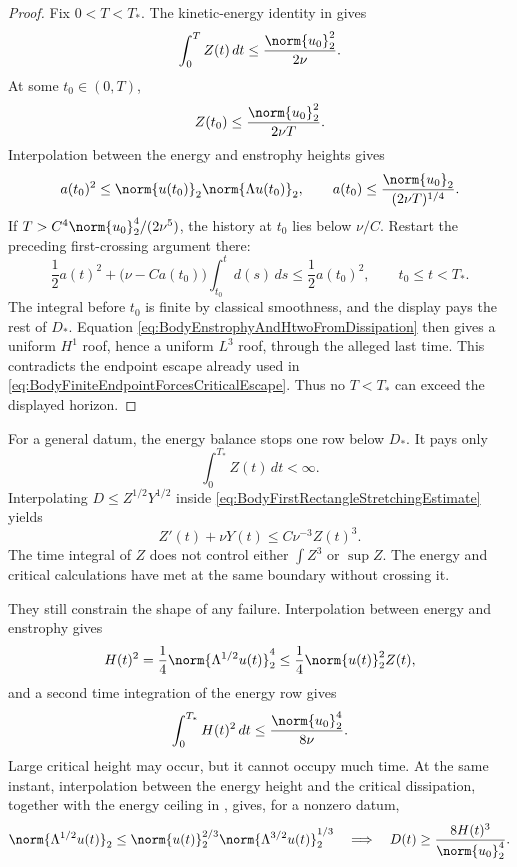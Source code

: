 \begin{proof}
Fix \(0<T<T_*\).  The kinetic-energy identity in
 gives
\[
  \int_0^T Z(t)\,dt
  \leq\frac{\norm{u_0}_2^2}{2\nu}.
\]
At some \(t_0\in(0,T)\),
\[
  Z(t_0)\leq\frac{\norm{u_0}_2^2}{2\nu T}.
\]
Interpolation between the energy and enstrophy heights gives
\[
  a(t_0)^2
  \leq\norm{u(t_0)}_2\norm{\Lambda u(t_0)}_2,
  \qquad
  a(t_0)
  \leq\frac{\norm{u_0}_2}{(2\nu T)^{1/4}}.
\]
If \(T>C^4\norm{u_0}_2^4/(2\nu^5)\), the history at \(t_0\) lies below
\(\nu/C\).  Restart the preceding first-crossing argument there:
\[
  \frac12a(t)^2
  +\bigl(\nu-Ca(t_0)\bigr)\int_{t_0}^t d(s)\,ds
  \leq\frac12a(t_0)^2,
  \qquad t_0\leq t<T_*.
\]
The integral before \(t_0\) is finite by classical smoothness, and the display
pays the rest of \(D_*\).  Equation
\eqref{eq:BodyEnstrophyAndHtwoFromDissipation} then gives a uniform \(H^1\)
roof, hence a uniform \(L^3\) roof, through the alleged last time.  This
contradicts the endpoint escape already used in
\eqref{eq:BodyFiniteEndpointForcesCriticalEscape}.  Thus no
\(T<T_*\) can exceed the displayed horizon.
\end{proof}

For a general datum, the energy balance stops one row below \(D_*\).  It pays
only
\[
  \int_0^{T_*}Z(t)\,dt<\infty.
\]
Interpolating \(D\leq Z^{1/2}Y^{1/2}\) inside
\eqref{eq:BodyFirstRectangleStretchingEstimate} yields
\begin{equation}\label{eq:BodyCubicEnstrophyObstruction}
  Z'(t)+\nu Y(t)
  \leq C\nu^{-3}Z(t)^3.
\end{equation}
The time integral of \(Z\) does not control either \(\int Z^3\) or
\(\sup Z\).  The energy and critical calculations have met at the same
boundary without crossing it.

They still constrain the shape of any failure.  Interpolation between energy
and enstrophy gives
\[
  H(t)^2
  =\frac14\norm{\Lambda^{1/2}u(t)}_2^4
  \leq\frac14\norm{u(t)}_2^2 Z(t),
\]
and a second time integration of the energy row gives
\begin{equation}\label{eq:BodyCriticalHeightTimeOccupancy}
  \int_0^{T_*}H(t)^2\,dt
  \leq\frac{\norm{u_0}_2^4}{8\nu}.
\end{equation}
Large critical height may occur, but it cannot occupy much time.  At the same
instant, interpolation between the energy height and the critical dissipation,
together with the energy ceiling in
, gives, for a nonzero datum,
\begin{equation}\label{eq:BodyCriticalDissipationLowerFromHeight}
  \norm{\Lambda^{1/2}u(t)}_2
  \leq
  \norm{u(t)}_2^{2/3}
  \norm{\Lambda^{3/2}u(t)}_2^{1/3}
  \quad\Longrightarrow\quad
  D(t)\geq\frac{8H(t)^3}{\norm{u_0}_2^4}.
\end{equation}

